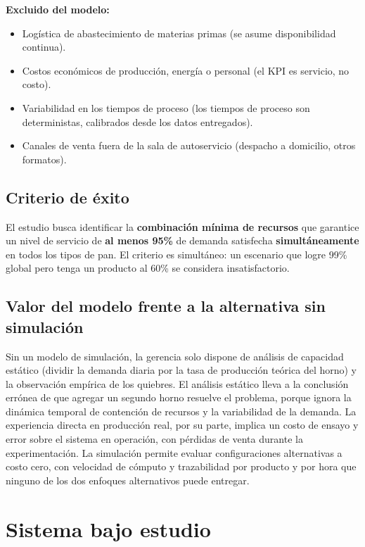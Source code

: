 \documentclass[12pt]{article}
\begin{document}
\textbf{Excluido del modelo:}
\begin{itemize}
  \item Logística de abastecimiento de materias primas (se asume disponibilidad continua).
  \item Costos económicos de producción, energía o personal (el KPI es servicio, no costo).
  \item Variabilidad en los tiempos de proceso (los tiempos de proceso son deterministas, calibrados desde los datos entregados).
  \item Canales de venta fuera de la sala de autoservicio (despacho a domicilio, otros formatos).
\end{itemize}

\subsection{Criterio de éxito}

El estudio busca identificar la \textbf{combinación mínima de recursos} que garantice un nivel de servicio de \textbf{al menos 95\%} de demanda satisfecha \textbf{simultáneamente} en todos los tipos de pan. El criterio es simultáneo: un escenario que logre 99\% global pero tenga un producto al 60\% se considera insatisfactorio.

\subsection{Valor del modelo frente a la alternativa sin simulación}

Sin un modelo de simulación, la gerencia solo dispone de análisis de capacidad estático (dividir la demanda diaria por la tasa de producción teórica del horno) y la observación empírica de los quiebres. El análisis estático lleva a la conclusión errónea de que agregar un segundo horno resuelve el problema, porque ignora la dinámica temporal de contención de recursos y la variabilidad de la demanda. La experiencia directa en producción real, por su parte, implica un costo de ensayo y error sobre el sistema en operación, con pérdidas de venta durante la experimentación. La simulación permite evaluar configuraciones alternativas a costo cero, con velocidad de cómputo y trazabilidad por producto y por hora que ninguno de los dos enfoques alternativos puede entregar.

\newpage
\section{Sistema bajo estudio}
\end{document}
